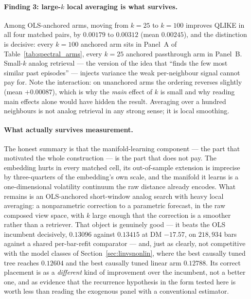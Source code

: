 \paragraph{Finding 3: large-$k$ local averaging is what survives.}
Among OLS-anchored arms, moving from $k = 25$ to $k = 100$ improves QLIKE in all
four matched pairs, by $0.00179$ to $0.00312$ (mean $0.00245$), and the
distinction is decisive: every $k = 100$ anchored arm sits in Panel~A of
Table~\ref{tab:spectral_arms}, every $k = 25$ anchored passthrough arm in Panel~B.
Small-$k$ analog retrieval --- the version of the idea that ``finds the few most
similar past episodes'' --- injects variance the weak per-neighbour signal cannot
pay for. Note the interaction: on unanchored arms the ordering reverses slightly
(mean $+0.00087$), which is why the \emph{main} effect of $k$ is small and why
reading main effects alone would have hidden the result. Averaging over a hundred
neighbours is not analog retrieval in any strong sense; it is local smoothing.

\paragraph{What actually survives measurement.}
The honest summary is that the manifold-learning component --- the part that
motivated the whole construction --- is the part that does not pay. The embedding
hurts in every matched cell, its out-of-sample extension is imprecise by
three-quarters of the embedding's own scale, and the manifold it learns is a
one-dimensional volatility continuum the raw distance already encodes. What remains
is an OLS-anchored short-window analog search with heavy local averaging: a
nonparametric correction to a parametric forecast, in the raw composed view space,
with $k$ large enough that the correction is a smoother rather than a retriever.
That object is genuinely good --- it beats the OLS incumbent decisively, $0.13096$
against $0.13415$ at DM $-17.57$, on $218{,}934$ bars against a shared
per-bar-refit comparator --- and, just as clearly, not competitive with the model
classes of Section~\ref{sec:linvsnonlin}, where the best causally tuned tree
reaches $0.12604$ and the best causally tuned linear arm $0.12788$. Its correct
placement is as a \emph{different} kind of improvement over the incumbent, not a
better one, and as evidence that the recurrence hypothesis in the form tested here
is worth less than reading the exogenous panel with a conventional estimator.

